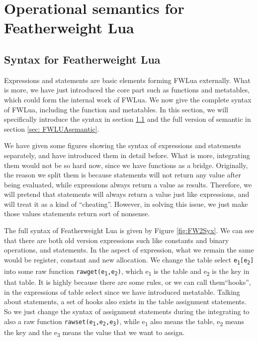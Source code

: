 \chapter{Operational semantics for Featherweight Lua} \label{chp: syntax and semantic}

\section{Syntax for Featherweight Lua}\label{sec: FWLUAsyntax}
Expressions and statements are basic elements forming FWLua externally. What is more, we have just introduced the core part such as functions and metatables, which could form the internal work of FWLua. We now give the complete syntax of FWLua, including the function and metatables. In this section, we will specifically introduce the syntax in section \ref{sec: FWLUAsyntax} and the full version of semantic in section \ref{sec: FWLUAsemantic}.

We have given some figures showing the syntax of expressions and statements separately, and have introduced them in detail before. What is more, integrating them would not be so hard now, since we have functions as a bridge. Originally, the reason we split them is because statements will not return any value after being evaluated, while expressions always return a value as results. Therefore, we will pretend that statements will always return a value just like expressions, and will treat it as a kind of ``cheating''. However, in solving this issue, we just make those values statements return sort of nonsense.

The full syntax of Featherweight Lua is given by Figure \ref{fig:FW2Syx}. We can see that there are both old version expressions such like constants and binary operations, and statements. In the aspect of expression, what we remain the same would be register, constant and new allocation. We change the table select {\tt e\textsubscript{1}[e\textsubscript{2}]} into some raw function {\tt rawget(e\textsubscript{1},e\textsubscript{2})}, which e\textsubscript{1} is the table and e\textsubscript{2} is the key in that table. It is highly because there are some rules, or we can call them``hooks'', in the expressions of table select since we have introduced metatable. Talking about statements, a set of hooks also exists in the table assignment statements. So we just change the syntax of assignment statements during the integrating to also a raw function {\tt rawset(e\textsubscript{1},e\textsubscript{2},e\textsubscript{3})}, while e\textsubscript{1} also means the table, e\textsubscript{2} means the key and the e\textsubscript{3} means the value that we want to assign. 

